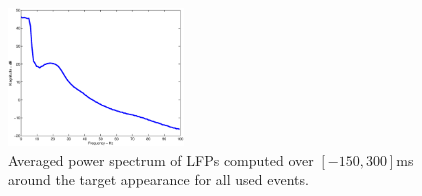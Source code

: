 \documentclass[letterpaper, 9pt, conference]{ieeeconf}
\begin{document}
\begin{figure}[ht!]
\begin{minipage}{10pc}
\includegraphics[width=11pc]{MeanPSD.eps}
\caption{\label{label}Averaged power spectrum of LFPs computed over $[-150,300]$ms around the target appearance for all used events.}
\end{minipage}


\end{figure}
\end{document}
